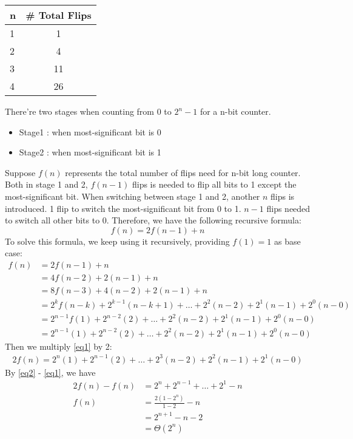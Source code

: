 \documentclass[11pt]{article}
\begin{document}
\begin{tabular}{l | c}
    n	&   \# Total Flips  \\\hline
    1  &   1  \\  
    2  &   4  \\
    3  &   11 \\
    4  &   26 \\
\end{tabular}

There're two stages when counting from 0 to $2^n-1$ for a n-bit counter. 

\begin{itemize}
	\item Stage1 : when most-significant bit is 0
	\item Stage2 : when most-significant bit is 1
\end{itemize}

Suppose $f(n)$ represents the total number of flips need for n-bit long counter. Both in stage 1 and 2, $f(n-1)$ flips is needed to flip all bits to 1 except the most-significant bit. When switching between stage 1 and 2, another $n$ flips is introduced. 1 flip to switch the most-significant bit from 0 to 1. $n-1$ flips needed to switch all other bits to 0. Therefore, we have the following recursive formula:
\[
	f(n) = 2f(n-1) + n
\]
To solve this formula, we keep using it recursively, providing $f(1) = 1$ as base case:
 \begin{align}
 	f(n) 	&= 2f(n-1) + n \nonumber \\
		&= 4f(n-2) + 2(n-1) + n \nonumber \\
		&= 8f(n-3) + 4(n-2) + 2(n-1) + n \nonumber \\
		&= 2^kf(n-k) + 2^{k-1}(n-k+1) + \ldots + 2^2(n-2) + 2^1(n-1) + 2^0(n-0) \nonumber \\
		&= 2^{n-1}f(1) + 2^{n-2}(2) + \ldots + 2^2(n-2) + 2^1(n-1) + 2^0(n-0) \nonumber  \\
		&= 2^{n-1}(1) + 2^{n-2}(2) + \ldots + 2^2(n-2) + 2^1(n-1) + 2^0(n-0) \label{eq1} 
 \end{align}
Then we multiply \eqref{eq1} by 2:
 \begin{align}
	2f(n) =  2^{n}(1) + 2^{n-1}(2) + \ldots + 2^3(n-2) + 2^2(n-1) + 2^1(n-0) \label{eq2}  
 \end{align}
By \eqref{eq2} - \eqref{eq1}, we have
 \begin{align*}
 	2f(n) - f(n) &= 2^n + 2^{n-1} + \ldots + 2^1 -n \\
	f(n)		&= \frac{2(1-2^n)}{1-2} - n \\
			&= 2^{n+1} - n - 2 \\
			&= \Theta(2^n)
  \end{align*}
  
\end{document}

